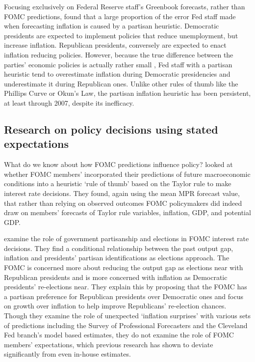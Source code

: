 \documentclass[a4paper]{article}\usepackage[]{graphicx}\usepackage[]{color}
\begin{document}
Focusing exclusively on Federal Reserve staff's Greenbook forecasts, rather than FOMC predictions, \cite{gandrud2013does} found that a large proportion of the error Fed staff made when forecasting inflation is caused by a partisan heuristic. Democratic presidents are expected to implement policies that reduce unemployment, but increase inflation. Republican presidents, conversely are expected to enact inflation reducing policies. However, because the true difference between the parties' economic policies is actually rather small \citep{Bartels2008}, Fed staff with a partisan heuristic tend to overestimate inflation during Democratic presidencies and underestimate it during Republican ones. Unlike other rules of thumb like the Phillips Curve or Okun's Law, the partisan inflation heuristic has been persistent, at least through 2007, despite its inefficacy.

\subsection{Research on policy decisions using stated expectations}

What do we know about how FOMC predictions influence policy? \cite{Orphanides2008} looked at whether FOMC members' incorporated their predictions of future macroeconomic conditions into  a heuristic `rule of thumb' based on the Taylor rule \citeyearpar{Taylor1993} to make interest rate decisions. They found, again using the mean MPR forecast value, that rather than relying on observed outcomes FOMC policymakers did indeed draw on members' forecasts of Taylor rule variables, inflation, GDP, and potential GDP.   

\cite{Clark2013} examine the role of government partisanship and elections in FOMC interest rate decisions. They find a conditional relationship between the past output gap, inflation and presidents' partisan identifications as elections approach. The FOMC is concerned more about reducing the output gap as elections near with Republican presidents and is more concerned with inflation as Democratic presidents' re-elections near. They explain this by proposing that the FOMC has a partisan preference for Republican presidents over Democratic ones and focus on growth over inflation to help improve Republicans' re-election chances. Though they examine the role of unexpected `inflation surprises' with various sets of predictions including the Survey of Professional Forecasters and the Cleveland Fed branch's model based estimates, they do not examine the role of FOMC members' expectations, which previous research has shown to deviate significantly from even in-house estimates.
\end{document}
